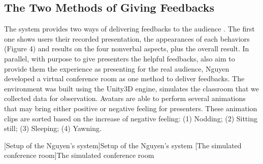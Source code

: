 \subsection*{The Two Methods of Giving Feedbacks}
\par The system provides two ways of delivering feedbacks to the audience \cite{nguyen2015intelligent}. The first one shows users their recorded presentation, the appearances of each behaviors (Figure 4) and results on the four nonverbal aspects, plus the overall result. In parallel, with purpose to give presenters the helpful feedbacks, also aim to provide them the experience as presenting for the real audience, Nguyen developed a virtual conference room as one method to deliver feedbacks. The environment was built using the Unity3D engine, simulates the classroom that we collected data for observation. Avatars are able to perform several animations that may bring either positive or negative feeling for presenters. These animation clips are sorted based on the increase of negative feeling: (1) Nodding; (2) Sitting still; (3) Sleeping; (4) Yawning.


[Setup of the Nguyen's system]{Setup of the Nguyen's system \cite{nguyen2015intelligent}}
[The simulated conference room]{The simulated conference room \cite{nguyen2015intelligent}}
